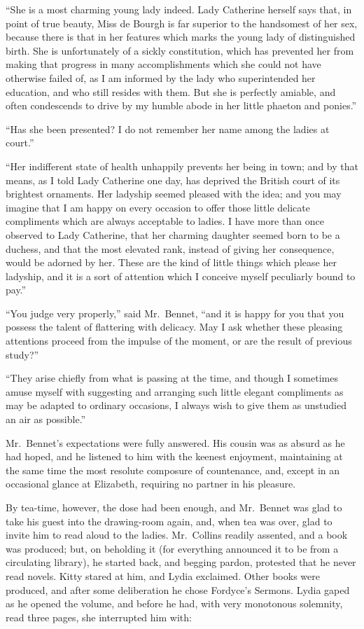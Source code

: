 \documentclass[12pt,english]{book}
\begin{document}
{}``She is a most charming young lady indeed. Lady Catherine herself
says that, in point of true beauty, Miss de Bourgh is far superior
to the handsomest of her sex, because there is that in her features
which marks the young lady of distinguished birth. She is unfortunately
of a sickly constitution, which has prevented her from making that
progress in many accomplishments which she could not have otherwise
failed of, as I am informed by the lady who superintended her education,
and who still resides with them. But she is perfectly amiable, and
often condescends to drive by my humble abode in her little phaeton
and ponies.''

{}``Has she been presented? I do not remember her name among the
ladies at court.''

{}``Her indifferent state of health unhappily prevents her being
in town; and by that means, as I told Lady Catherine one day, has
deprived the British court of its brightest ornaments. Her ladyship
seemed pleased with the idea; and you may imagine that I am happy
on every occasion to offer those little delicate compliments which
are always acceptable to ladies. I have more than once observed to
Lady Catherine, that her charming daughter seemed born to be a duchess,
and that the most elevated rank, instead of giving her consequence,
would be adorned by her. These are the kind of little things which
please her ladyship, and it is a sort of attention which I conceive
myself peculiarly bound to pay.''

{}``You judge very properly,'' said Mr.\ Bennet, {}``and it is
happy for you that you possess the talent of flattering with delicacy.
May I ask whether these pleasing attentions proceed from the impulse
of the moment, or are the result of previous study?''\ 

{}``They arise chiefly from what is passing at the time, and though
I sometimes amuse myself with suggesting and arranging such little
elegant compliments as may be adapted to ordinary occasions, I always
wish to give them as unstudied an air as possible.''

Mr.\ Bennet's expectations were fully answered. His cousin was as
absurd as he had hoped, and he listened to him with the keenest enjoyment,
maintaining at the same time the most resolute composure of countenance,
and, except in an occasional glance at Elizabeth, requiring no partner
in his pleasure.

By tea-time, however, the dose had been enough, and Mr.\ Bennet was
glad to take his guest into the drawing-room again, and, when tea
was over, glad to invite him to read aloud to the ladies. Mr.\ Collins
readily assented, and a book was produced; but, on beholding it (for
everything announced it to be from a circulating library), he started
back, and begging pardon, protested that he never read novels. Kitty
stared at him, and Lydia exclaimed. Other books were produced, and
after some deliberation he chose Fordyce's Sermons. Lydia gaped as
he opened the volume, and before he had, with very monotonous solemnity,
read three pages, she interrupted him with:
\end{document}
